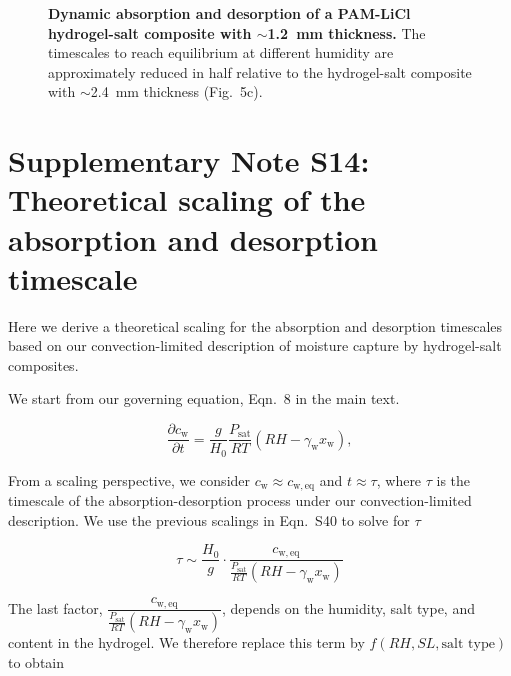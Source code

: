 \documentclass[11pt]{article}
\begin{document}
\begin{figure}[htbp]
\centering
{}
\caption{\textbf{Dynamic absorption and desorption of a PAM-LiCl hydrogel-salt composite with $\sim$1.2~mm thickness.} The timescales to reach equilibrium at different humidity are approximately reduced in half relative to the hydrogel-salt composite with $\sim$2.4~mm thickness (Fig.~5c).}
\label{fig:S9}
\end{figure}

\clearpage

\section*{Supplementary Note S14: Theoretical scaling of the absorption and desorption timescale}

Here we derive a theoretical scaling for the absorption and desorption timescales based on our convection-limited description of moisture capture by hydrogel-salt composites.

We start from our governing equation, Eqn.~8 in the main text.

\begin{equation}
\frac{\partial c_\mathrm{w}}{\partial t} = \frac{g}{H_0}\frac{P_\mathrm{sat}}{RT}\left(RH - \gamma_\mathrm{w} x_\mathrm{w}\right), \tag{S40}
\end{equation}

From a scaling perspective, we consider $c_\mathrm{w} \approx c_\mathrm{w,eq}$ and $t \approx \tau$, where $\tau$ is the timescale of the absorption-desorption process under our convection-limited description. We use the previous scalings in Eqn.~S40 to solve for $\tau$

\begin{equation}
\tau \sim \frac{H_0}{g}\cdot \frac{c_\mathrm{w,eq}}{\frac{P_\mathrm{sat}}{RT}(RH-\gamma_\mathrm{w} x_\mathrm{w})} \tag{S41}
\end{equation}

The last factor, $\dfrac{c_\mathrm{w,eq}}{\frac{P_\mathrm{sat}}{RT}(RH-\gamma_\mathrm{w} x_\mathrm{w})}$, depends on the humidity, salt type, and content in the hydrogel. We therefore replace this term by $f(RH, SL, \text{salt type})$ to obtain
\end{document}
